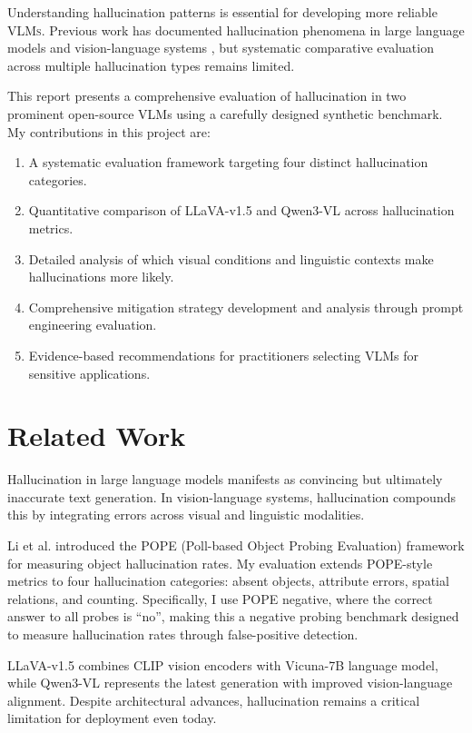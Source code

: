 \documentclass[11pt,a4paper]{article}
\newcommand{\VLMs}{\textsc{VLMs}}
\begin{document}
Understanding hallucination patterns is essential for developing more reliable \VLMs. Previous work has documented hallucination phenomena in large language models and vision-language systems \cite{rohrbach2018object, li2023hallucination}, but systematic comparative evaluation across multiple hallucination types remains limited.

This report presents a comprehensive evaluation of hallucination in two prominent open-source VLMs using a carefully designed synthetic benchmark. My contributions in this project are:

\begin{enumerate}
    \item A systematic evaluation framework targeting four distinct hallucination categories.
    \item Quantitative comparison of LLaVA-v1.5 and Qwen3-VL across hallucination metrics.
    \item Detailed analysis of which visual conditions and linguistic contexts make hallucinations more likely.    \item Comprehensive mitigation strategy development and analysis through prompt engineering evaluation.    \item Evidence-based recommendations for practitioners selecting VLMs for sensitive applications.
\end{enumerate}

\section{Related Work}

Hallucination in large language models manifests as convincing but ultimately inaccurate text generation. In vision-language systems, hallucination compounds this by integrating errors across visual and linguistic modalities.

Li et al. \cite{li2023hallucination} introduced the POPE (Poll-based Object Probing Evaluation) framework for measuring object hallucination rates. My evaluation extends POPE-style metrics to four hallucination categories: absent objects, attribute errors, spatial relations, and counting. Specifically, I use POPE negative, where the correct answer to all probes is ``no'', making this a negative probing benchmark designed to measure hallucination rates through false-positive detection.

LLaVA-v1.5 \cite{liu2024improved} combines CLIP vision encoders with Vicuna-7B language model, while Qwen3-VL \cite{bai2025qwen3vl} represents the latest generation with improved vision-language alignment. Despite architectural advances, hallucination remains a critical limitation for deployment even today.
\end{document}
